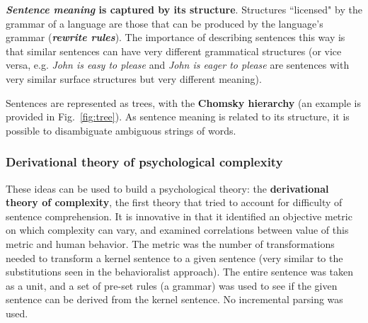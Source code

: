 \textbf{\textit{Sentence meaning} is captured by its structure}. Structures ``licensed" by the grammar of a language are those that can be produced by the language's grammar (\textbf{\textit{rewrite rules}}). The importance of describing sentences this way is that similar sentences can have very different grammatical structures (or vice versa, e.g. \textit{John is easy to please} and \textit{John is eager to please} are sentences with very similar surface structures but very different meaning).

Sentences are represented as trees, with the \textbf{Chomsky hierarchy} (an example is provided in Fig.~\ref{fig:tree}). As sentence meaning is related to its structure, it is possible to disambiguate ambiguous strings of words.

\subsubsection{Derivational theory of psychological complexity}
These ideas can be used to build a psychological theory: the \textbf{derivational theory of complexity}, the first theory that tried to account for difficulty of sentence comprehension. It is innovative in that it identified an objective metric on which complexity can vary, and examined correlations between value of this metric and human behavior. The metric was the number of transformations needed to transform a kernel sentence to a given sentence (very similar to the substitutions seen in the behavioralist approach). The entire sentence was taken as a unit, and a set of pre-set rules (a grammar) was used to see if the given sentence can be derived from the kernel sentence. No incremental parsing was used.
